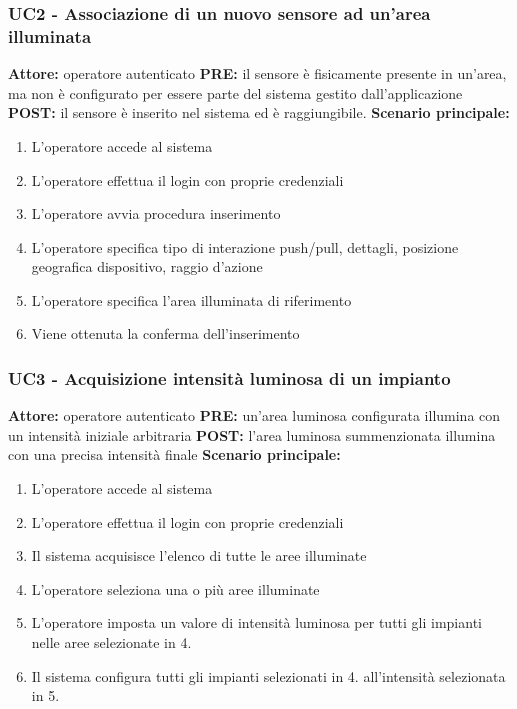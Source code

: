 \documentclass[a4paper, 12pt]{article}
\begin{document}
\subsubsection{UC2 - Associazione di un nuovo sensore ad un'area illuminata}
\textbf{Attore:} operatore autenticato\newline
\textbf{PRE:} il sensore è fisicamente presente in un'area, ma non è configurato per essere parte del sistema gestito dall'applicazione\newline
\textbf{POST:} il sensore è inserito nel sistema ed è raggiungibile.\newline
\textbf{Scenario principale:}
\begin{enumerate}
    \item L'operatore accede al sistema
    \item L'operatore effettua il login con proprie credenziali
    \item L'operatore avvia procedura inserimento
    \item L'operatore specifica tipo di interazione push/pull, dettagli, posizione geografica dispositivo, raggio d'azione
    \item L'operatore specifica l'area illuminata di riferimento
    \item Viene ottenuta la conferma dell'inserimento
\end{enumerate}

\subsubsection{UC3 - Acquisizione intensità luminosa di un impianto}
\textbf{Attore:} operatore autenticato\newline
\textbf{PRE:} un'area luminosa configurata illumina con un intensità iniziale arbitraria\newline
\textbf{POST:} l'area luminosa summenzionata illumina con una precisa intensità finale\newline
\textbf{Scenario principale:}
\begin{enumerate}
    \item L'operatore accede al sistema
    \item L'operatore effettua il login con proprie credenziali
    \item Il sistema acquisisce l'elenco di tutte le aree illuminate
    \item L'operatore seleziona una o più aree illuminate
    \item L'operatore imposta un valore di intensità luminosa per tutti gli impianti nelle aree selezionate in 4.
    \item Il sistema configura tutti gli impianti selezionati in 4. all'intensità selezionata in 5.
\end{enumerate}
\end{document}
